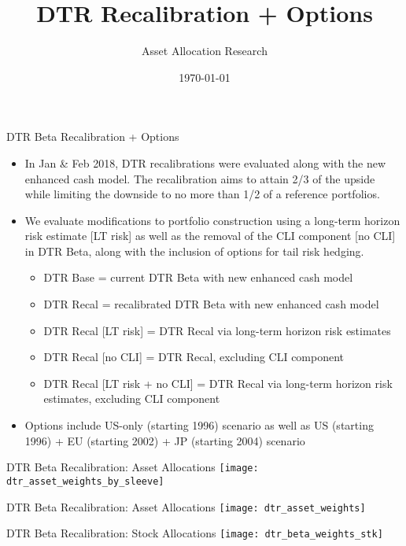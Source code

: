 \documentclass{beamer}
\title[DTR Recalibration + Options]{DTR Recalibration + Options}
\author[ Asset Allocation Research ]{ Asset Allocation Research }
\date{\today}
\begin{document}
\begin{frame}
  \titlepage
\end{frame}

\begin{frame}{DTR Beta Recalibration + Options}

\begin{itemize}
\item In Jan \& Feb 2018, DTR recalibrations were evaluated along with the new enhanced cash model. The recalibration aims to attain 2/3 of the upside while limiting the downside to no more than 1/2 of a reference portfolios.

\item We evaluate modifications to portfolio construction using a long-term horizon risk estimate [LT risk] as well as the removal of the CLI component [no CLI] in DTR Beta, along with the inclusion of options for tail risk hedging.

\begin{itemize}
\item DTR Base = current DTR Beta with new enhanced cash model
\item DTR Recal = recalibrated DTR Beta with new enhanced cash model
\item DTR Recal [LT risk] = DTR Recal via long-term horizon risk estimates
\item DTR Recal [no CLI] = DTR Recal, excluding CLI component
\item DTR Recal [LT risk + no CLI] = DTR Recal via long-term horizon risk estimates, excluding CLI component
\end{itemize}

\item Options include US-only (starting 1996) scenario as well as US (starting 1996) + EU (starting 2002) + JP (starting 2004) scenario

\end{itemize}

\end{frame}

\begin{frame}{DTR Beta Recalibration: Asset Allocations}
\texttt{[image: dtr\_asset\_weights\_by\_sleeve]}
\end{frame}

\begin{frame}{DTR Beta Recalibration: Asset Allocations}
\texttt{[image: dtr\_asset\_weights]}
\end{frame}

\begin{frame}{DTR Beta Recalibration: Stock Allocations}
\texttt{[image: dtr\_beta\_weights\_stk]}
\end{frame}
\end{document}
